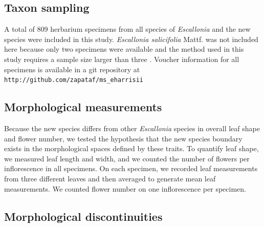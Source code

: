 \documentclass[fleqn,10pt,lineno]{wlpeerj} %
\begin{document}
\subsection*{Taxon sampling}

A total of 809 herbarium specimens from all species of \emph{Escallonia} and the new species were included in this study. \emph{Escallonia salicifolia} Mattf. was not included here because only two specimens were available and the method used in this study requires a sample size larger than three \citep{Zapata:2012it}. Voucher information for all specimens is available in a git repository at \texttt{http://github.com/zapataf/ms\_eharrisii}

\subsection*{Morphological measurements}

Because the new species differs from other \emph{Escallonia} species in overall leaf shape and flower number, we tested the hypothesis that the new species boundary exists in the morphological spaces defined by these traits. To quantify leaf shape, we measured leaf length and width, and we counted the number of flowers per inflorescence in all specimens. On each specimen, we recorded leaf measurements from three different leaves and then averaged to generate mean leaf measurements. We counted flower number on one inflorescence per specimen.

\subsection*{Morphological discontinuities}
\end{document}
